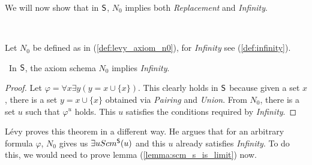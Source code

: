 We will now show that in $\sf{S}$, $N_0$ implies both \emph{Replacement} and \emph{Infinity}.

\

Let $N_0$ be defined as in (\ref{def:levy_axiom_n0}), for \emph{Infinity} see (\ref{def:infinity}).
\begin{theorem}\label{theorem:n0_implies_infinity}\
In $\sf{S}$, the axiom schema $N_0$ implies \emph{Infinity}.
\end{theorem}

\begin{proof} %
Let $\varphi = \forall x \exists y (y = x \cup \{x\})$. 
This clearly holds in $\sf{S}$ because given a set $x$, there is a set $y = x \cup \{x\}$ obtained via \emph{Pairing} and \emph{Union}. %
From $N_0$, there is a set $u$ such that $\varphi^{u}$ holds. %
 This $u$ satisfies the conditions required by \emph{Infinity}.
\end{proof}

Lévy proves this theorem in a different way. He argues that for an arbitrary formula $\varphi$, $N_0$ gives us $\exists u Scm^{\sf{S}}(u)$ and this $u$ already satisfies \emph{Infinity}. 
To do this, we would need to prove lemma (\ref{lemma:scm_s_is_limit}) now.

\

